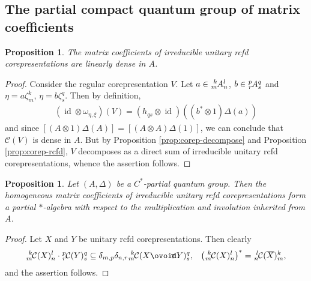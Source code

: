 \documentclass[11pt]{article}
\DeclareMathOperator{\id}{id}
\newcommand{\Circt}{{\mathop{\ooalign{$\ovoid$\cr\hidewidth\raise-.05ex\hbox{$\scriptstyle\mathsf T\mkern3.5mu$}\cr}}}} %
\newcommand{\Gr}[5]{\tensor*[^{#2}_{#4}]{#1}{^{#3}_{#5}}}%
\newtheorem{Prop}[Theorem]{Proposition}
\theoremstyle{definition}
\numberwithin{equation}{section}
\begin{document}
 \subsection{The  partial compact quantum group of  matrix coefficients}
\begin{Prop}
  The matrix coefficients of irreducible unitary rcfd corepresentations
  are linearly dense in $A$.
\end{Prop}
\begin{proof}
  Consider the regular corepresentation $V$. Let $a\in \Gr{A}{k}{l}{m}{n}$, $b\in
  \Gr{A}{p}{q}{r}{s}$ and $\eta=a\zeta^{k}_{m}$, $\eta=b\zeta^{q}_{s}$. Then by definition,
  \begin{align*}
    (\id \otimes \omega_{\eta,\xi})(V) = (h_{qs}\otimes \id)((b^{*} \otimes
    1)\Delta(a))
  \end{align*}
  and since $[(A\otimes 1)\Delta(A)]=[(A\otimes A)\Delta(1)]$, we can conclude that $\mathcal{C}(V)$
  is dense in $A$. But by Proposition \ref{prop:corep-decompose} and Proposition \ref{prop:corep-rcfd}, $V$ decomposes as a direct sum of
  irreducible unitary rcfd corepresentations, whence the assertion follows.
\end{proof}
\begin{Prop}
  Let $(A,\Delta)$ be a $C^{*}$-partial quantum group. Then the homogeneous matrix coefficients of
  irreducible unitary rcfd corepresentations form a partial $*$-algebra with respect to the
  multiplication and involution inherited from $A$.
\end{Prop}
\begin{proof}
  Let $X$ and $Y$ be unitary rcfd corepresentations. Then clearly
  \begin{align*}
    \Gr{\mathcal{C}(X)}{k}{l}{m}{n} \cdot \Gr{\mathcal{C}(Y)}{p}{q}{r}{s} &\subseteq
    \delta_{m,p}\delta_{n,r} \Gr{\mathcal{C}(X\Circt Y)}{k}{q}{m}{s}, &
    \left(\Gr{\mathcal{C}(X)}{k}{l}{m}{n}\right)^{*} = \Gr{\mathcal{C}(\overline{X})}{l}{k}{n}{m},
  \end{align*}
and the assertion follows.
\end{proof}
\end{document}
